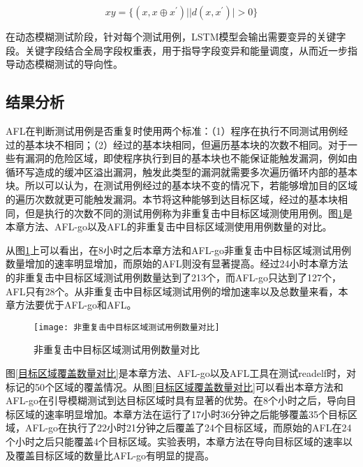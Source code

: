 \begin{equation}\label{构造训练集}
xy = \{(x,x \oplus x^{'}) | |d(x,x^{'})| > 0\}
\end{equation}

在动态模糊测试阶段，针对每个测试用例，LSTM模型会输出需要变异的关键字段。关键字段结合全局字段权重表，用于指导字段变异和能量调度，从而近一步指导动态模糊测试的导向性。

\subsection{结果分析}

AFL在判断测试用例是否重复时使用两个标准：（1）程序在执行不同测试用例经过的基本块不相同；（2）经过的基本块相同，但遍历基本块的次数不相同。对于一些有漏洞的危险区域，即使程序执行到目的基本块也不能保证能触发漏洞，例如由循环写造成的缓冲区溢出漏洞，触发此类型的漏洞就需要多次遍历循环内部的基本块。所以可以认为，在测试用例经过的基本块不变的情况下，若能够增加目的区域的遍历次数就更可能触发漏洞。本节将这种能够到达目标区域，经过的基本块相同，但是执行的次数不同的测试用例称为非重复击中目标区域测使用用例。图\ref{非重复击中目标区域测试用例数量对比}是本章方法、AFL-go以及AFL的非重复击中目标区域测使用用例数量的对比。

从图\ref{非重复击中目标区域测试用例数量对比}上可以看出，在8小时之后本章方法和AFL-go非重复击中目标区域测试用例数量增加的速率明显增加，而原始的AFL则没有显著提高。经过24小时本章方法的非重复击中目标区域测试用例数量达到了213个，而AFL-go只达到了127个，AFL只有28个。从非重复击中目标区域测试用例的增加速率以及总数量来看，本章方法要优于AFL-go和AFL。

\begin{figure}[htb]
\begin{center}
\texttt{[image: 非重复击中目标区域测试用例数量对比]}
\end{center}
\caption{非重复击中目标区域测试用例数量对比}
\label{非重复击中目标区域测试用例数量对比}
\end{figure}

图\ref{目标区域覆盖数量对比}是本章方法、AFL-go以及AFL工具在测试readelf时，对标记的50个区域的覆盖情况。从图\ref{目标区域覆盖数量对比}可以看出本章方法和AFL-go在引导模糊测试到达目标区域时具有显著的优势。在8个小时之后，导向目标区域的速率明显增加。本章方法在运行了17小时36分钟之后能够覆盖35个目标区域，AFL-go在执行了22小时21分钟之后覆盖了24个目标区域，而原始的AFL在24个小时之后只能覆盖4个目标区域。实验表明，本章方法在导向目标区域的速率以及覆盖目标区域的数量比AFL-go有明显的提高。

